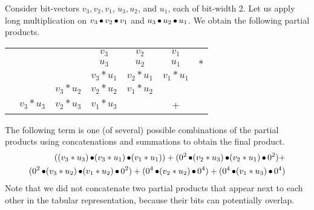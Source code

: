 \begin{example}
  Consider bit-vectors $v_3,v_2,v_1$, $u_3,u_2$, and $u_1$, each of
  bit-width 2.  Let us apply long multiplication on $v_3 \mathop{\bullet} v_2
  \mathop{\bullet} v_1$ and $u_3 \mathop{\bullet} u_2 \mathop{\bullet} u_1$.  We obtain the
  following partial products.
\begin{center}
\vspace{-2ex}
\begin{tabular}{c@{\quad}c@{\quad}c@{\quad}c@{\quad}c@{\quad}c@{\quad}c}
  &&& $v_3$ & $v_2$ & $v_1$&\\ 
  &&& $u_3$ & $u_2$ & $u_1$&$*$\\ \hline
  &&& $v_3*u_1$ & $v_2*u_1$ & $v_1*u_1$&\\
  && $v_3*u_2$ & $v_2*u_2$ & $v_1*u_2$ && \\
  & $v_3*u_3$ & $v_2*u_3$ &$v_1*u_3$&  & +&\\\hline
\end{tabular}
\end{center}
The following term is one (of several) possible combinations of the
partial products using concatenations and summations to obtain the
final product.
\vspace{-1ex}
\begin{align*}
  ((v_3*u_3) \concat (v_3*u_1) \concat (v_1*u_1)) +
  (0^2 \concat (v_2*u_3) \concat (v_2*u_1) \concat 0^2) +\\
  (0^2 \concat (v_3*u_2) \concat (v_1*u_2) \concat 0^2) +
  (0^4 \concat (v_2*u_2) \concat 0^4) + (0^4 \concat (v_1*u_3) \concat 0^4)
\vspace{-1ex}
\end{align*}
%
%
Note that we did not concatenate two partial products that appear next
to each other in the tabular representation, because their bits can
potentially overlap.

\end{example}


